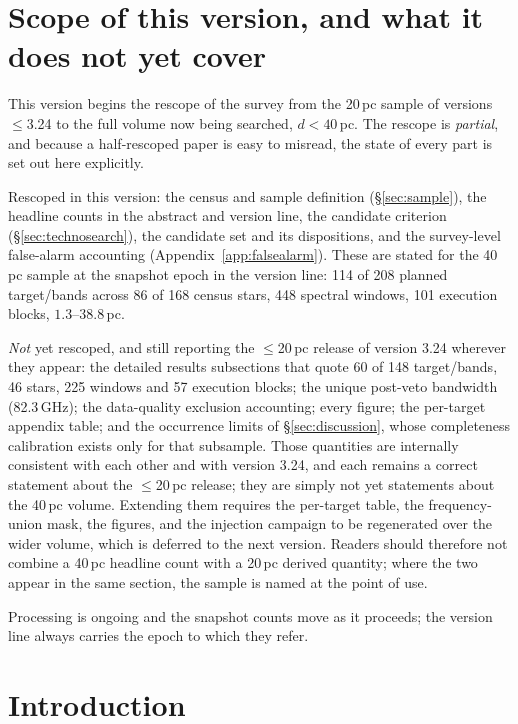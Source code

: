 \documentclass{openjournal}
\begin{document}
\section*{Scope of this version, and what it does not yet cover}

This version begins the rescope of the survey from the 20\,pc sample of
versions $\le$3.24 to the full volume now being searched, $d<40$\,pc.
The rescope is \emph{partial}, and because a half-rescoped paper is
easy to misread, the state of every part is set out here explicitly.

Rescoped in this version: the census and sample definition
(\S\ref{sec:sample}), the headline counts in the abstract and version
line, the candidate criterion (\S\ref{sec:technosearch}), the
candidate set and its dispositions, and the survey-level false-alarm
accounting (Appendix~\ref{app:falsealarm}). These are stated for the
40\,pc sample at the snapshot epoch in the version line: 114 of 208
planned target/bands across 86 of 168 census stars, 448 spectral
windows, 101 execution blocks, $1.3$--$38.8$\,pc.

\emph{Not} yet rescoped, and still reporting the $\le$20\,pc release of
version 3.24 wherever they appear: the detailed results subsections
that quote 60 of 148 target/bands, 46 stars, 225 windows and 57
execution blocks; the unique post-veto bandwidth (82.3\,GHz); the
data-quality exclusion accounting; every figure; the per-target
appendix table; and the occurrence limits of
\S\ref{sec:discussion}, whose completeness calibration exists only for
that subsample. Those quantities are internally consistent with each
other and with version 3.24, and each remains a correct statement
about the $\le$20\,pc release; they are simply not yet statements about
the 40\,pc volume. Extending them requires the per-target table, the
frequency-union mask, the figures, and the injection campaign to be
regenerated over the wider volume, which is deferred to the next
version. Readers should therefore not combine a 40\,pc headline count
with a 20\,pc derived quantity; where the two appear in the same
section, the sample is named at the point of use.

Processing is ongoing and the snapshot counts move as it proceeds;
the version line always carries the epoch to which they refer.

\section{Introduction}
\label{sec:intro}
\end{document}
